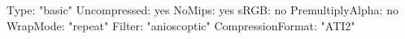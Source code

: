 Type: "basic"
Uncompressed: yes
NoMips: yes
sRGB: no
PremultiplyAlpha: no
WrapMode: "repeat"
Filter: "anioscoptic"
CompressionFormat: "ATI2"
